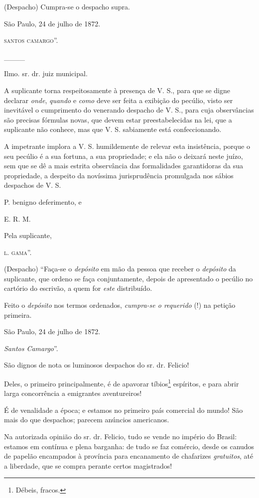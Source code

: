 (Despacho) Cumpra-se o despacho supra.

São Paulo, 24 de julho de 1872.

\textsc{santos camargo}''.

\_\_\_\_

Ilmo. sr. dr. juiz municipal.

A suplicante torna respeitosamente à presença de V. S., para que se
digne declarar \emph{onde}, \emph{quando} e \emph{como} deve ser feita a
exibição do pecúlio, visto ser inevitável o cumprimento do venerando
despacho de V. S., para cuja observâncias são precisas fórmulas novas,
que devem estar preestabelecidas na lei, que a suplicante não conhece,
mas que V. S. sabiamente está confeccionando.

A impetrante implora a V. S. humildemente de relevar esta insistência,
porque o seu pecúlio é a sua fortuna, a sua propriedade; e ela não o
deixará neste juízo, sem que se dê a mais estrita observância das
formalidades garantidoras da sua propriedade, a despeito da novíssima
jurisprudência promulgada nos sábios despachos de V. S.

P. benigno deferimento, e

E. R. M.

Pela suplicante,

\textsc{l. gama}''.

(Despacho) ``Faça-se o \emph{depósito} em mão da pessoa que receber o
\emph{depósito} da suplicante, que ordeno se faça conjuntamente, depois
de apresentado o pecúlio no cartório do escrivão, a quem for \emph{este}
distribuído.

Feito o \emph{depósito} nos termos ordenados, \emph{cumpra-se o
requerido} (!) na petição primeira.

São Paulo, 24 de julho de 1872.

\emph{Santos Camargo}''.

São dignos de nota os luminosos despachos do sr. dr. Felicio!

Deles, o primeiro principalmente, é de apavorar tíbios\footnote{
  Débeis, fracos.} espíritos, e para abrir larga concorrência a
emigrantes aventureiros!

É de venalidade a época; e estamos no primeiro país comercial do mundo!
São mais do que despachos; parecem anúncios americanos.

Na autorizada opinião do sr. dr. Felicio, tudo se vende no império do
Brasil: estamos em contínua e plena barganha: de tudo se faz comércio,
desde os canudos de papelão encampados à província para encanamento de
chafarizes \emph{gratuitos}, até a liberdade, que se compra perante
certos magistrados!

